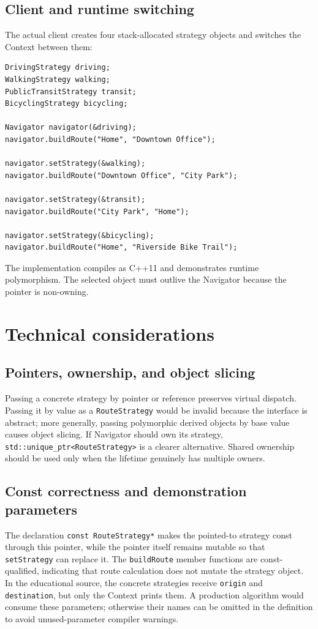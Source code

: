 \documentclass[11pt,a4paper]{report}
\begin{document}
\subsection{Client and runtime switching}
The actual client creates four stack-allocated strategy objects and switches the
Context between them:

\begin{lstlisting}[style=cpp]
DrivingStrategy driving;
WalkingStrategy walking;
PublicTransitStrategy transit;
BicyclingStrategy bicycling;

Navigator navigator(&driving);
navigator.buildRoute("Home", "Downtown Office");

navigator.setStrategy(&walking);
navigator.buildRoute("Downtown Office", "City Park");

navigator.setStrategy(&transit);
navigator.buildRoute("City Park", "Home");

navigator.setStrategy(&bicycling);
navigator.buildRoute("Home", "Riverside Bike Trail");
\end{lstlisting}

The implementation compiles as C++11 and demonstrates runtime polymorphism. The
selected object must outlive the Navigator because the pointer is non-owning.

\section{Technical considerations}
\subsection{Pointers, ownership, and object slicing}
Passing a concrete strategy by pointer or reference preserves virtual dispatch.
Passing it by value as a \texttt{RouteStrategy} would be invalid because the
interface is abstract; more generally, passing polymorphic derived objects by
base value causes object slicing. If Navigator should own its strategy,
\texttt{std::unique\_ptr<RouteStrategy>} is a clearer alternative. Shared
ownership should be used only when the lifetime genuinely has multiple owners.

\subsection{Const correctness and demonstration parameters}
The declaration \texttt{const RouteStrategy*} makes the pointed-to strategy
const through this pointer, while the pointer itself remains mutable so that
\texttt{setStrategy} can replace it. The \texttt{buildRoute} member functions
are const-qualified, indicating that route calculation does not mutate the
strategy object. In the educational source, the concrete strategies receive
\texttt{origin} and
\texttt{destination}, but only the Context prints them. A production algorithm
would consume these parameters; otherwise their names can be omitted in the
definition to avoid unused-parameter compiler warnings.
\end{document}
